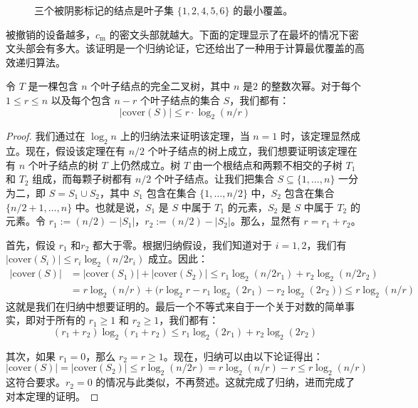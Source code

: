 
\begin{figure}
  \centering
  
  \caption{三个被阴影标记的结点是叶子集 $\{1,2,4,5,6\}$ 的最小覆盖。}
  \label{fig:5-6}
\end{figure}

被撤销的设备越多，$c_\mathrm{m}$ 的密文头部就越大。下面的定理显示了在最坏的情况下密文头部会有多大。该证明是一个归纳论证，它还给出了一种用于计算最优覆盖的高效递归算法。

\begin{theorem}\label{theo:5-8}
令 $T$ 是一棵包含 $n$ 个叶子结点的完全二叉树，其中 $n$ 是$2$ 的整数次幂。对于每个 $1\leq r\leq n$ 以及每个包含 $n-r$ 个叶子结点的集合 $S$，我们都有：
\[
|\mathrm{cover}(S)|\leq r\cdot\log_2(n/r)
\]
\end{theorem}

\begin{proof}
我们通过在 $\log_2n$ 上的归纳法来证明该定理，当 $n=1$ 时，该定理显然成立。现在，假设该定理在有 $n/2$ 个叶子结点的树上成立，我们想要证明该定理在有 $n$ 个叶子结点的树 $T$ 上仍然成立。树 $T$ 由一个根结点和两颗不相交的子树 $T_1$ 和 $T_2$ 组成，而每颗子树都有 $n/2$ 个叶子结点。让我们把集合 $S\subseteq\{1,\dots,n\}$ 一分为二，即 $S=S_1\cup S_2$，其中 $S_1$ 包含在集合 $\{1,\dots,n/2\}$ 中，$S_2$ 包含在集合 $\{n/2+1,\dots,n\}$ 中。也就是说，$S_1$ 是 $S$ 中属于 $T_1$ 的元素，$S_2$ 是 $S$ 中属于 $T_2$ 的元素。令 $r_1:=(n/2)-|S_1|$，$r_2:=(n/2)-|S_2|$。那么，显然有 $r=r_1+r_2$。

首先，假设 $r_1$ 和$r_2$ 都大于零。根据归纳假设，我们知道对于 $i=1,2$，我们有 $|\mathrm{cover}(S_i)|\leq r_i\log_2(n/2r_i)$ 成立。因此：
\[
\begin{aligned}
|\mathrm{cover}(S)| & = |\mathrm{cover}(S_1)| + |\mathrm{cover}(S_2)| \leq r_1\log_2(n/2r_1)+r_2\log_2(n/2r_2)\\
& = r\log_2(n/r) + \big(r\log_2r-r_1\log_2(2r_1)-r_2\log_2(2r_2)\big) \leq r\log_2(n/r)
\end{aligned}
\]
这就是我们在归纳中想要证明的。最后一个不等式来自于一个关于对数的简单事实，即对于所有的 $r_1\geq1$ 和 $r_2\geq1$，我们都有：
\[
(r_1+r_2)\log_2(r_1+r_2)\leq r_1\log_2(2r_1)+r_2\log_2(2r_2)
\]

其次，如果 $r_1=0$，那么 $r_2=r\geq1$。现在，归纳可以由以下论证得出：
\[
|\mathrm{cover}(S)| = |\mathrm{cover}(S_2)| \leq r\log_2(n/2r) = r\log_2(n/r)-r \leq r\log_2(n/r)
\]
这符合要求。$r_2=0$ 的情况与此类似，不再赘述。这就完成了归纳，进而完成了对本定理的证明。
\end{proof}

